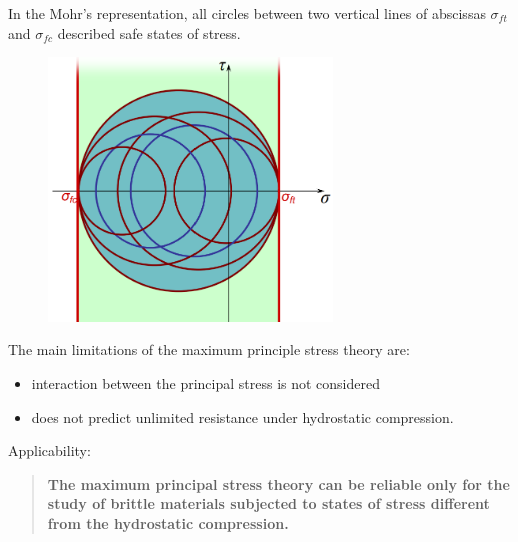 \documentclass[class=report, crop=false, 12pt,a4paper]{standalone}
\begin{document}
In the Mohr's representation, all circles between two vertical lines of abscissas $\sigma_{ft}$ and $\sigma_{fc}$ described safe states of stress.
\begin{figure}[H]
  \centering
  \includegraphics[height = 7cm]{../img/diagram80.png}
  \caption{}
\end{figure}
The main limitations of the maximum principle stress theory are:
\begin{itemize}
  \item interaction between the principal stress is not considered
  \item does not predict unlimited resistance under hydrostatic compression. 
\end{itemize}
Applicability:
\begin{quotation}
  \textbf{The maximum principal stress theory can be reliable only for the study of brittle materials subjected to states of stress different from the hydrostatic compression.}
\end{quotation}
\end{document}
